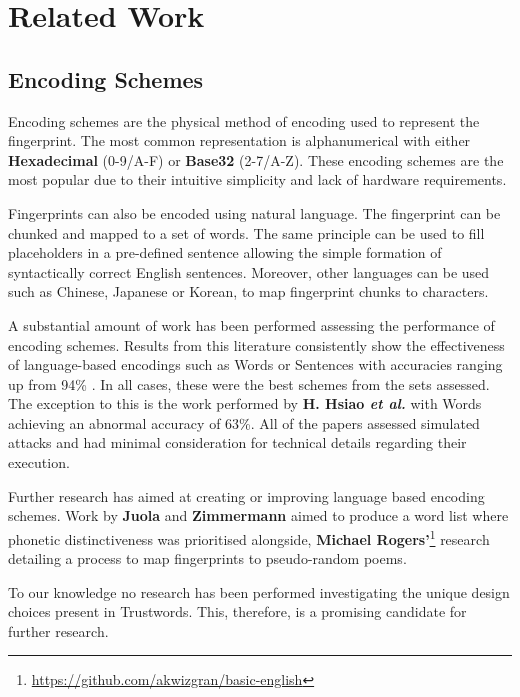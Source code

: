 \section{Related Work}

\subsection{Encoding Schemes}
Encoding schemes are the physical method of encoding used to represent the fingerprint. The most common representation is alphanumerical with either \textbf{Hexadecimal} (0-9/A-F) or \textbf{Base32} (2-7/A-Z). These encoding schemes are the most popular due to their intuitive simplicity and lack of hardware requirements.

Fingerprints can also be encoded using natural language. The fingerprint can be chunked and mapped to a set of words. The same principle can be used to fill placeholders in a pre-defined sentence allowing the simple formation of syntactically correct English sentences. Moreover, other languages can be used such as Chinese, Japanese or Korean, to map fingerprint chunks to characters.

A substantial amount of work has been performed assessing the performance of encoding schemes. Results from this literature consistently show the effectiveness of language-based encodings such as Words or Sentences with accuracies ranging up from 94\% \cite{dechand2016empirical}\cite{tan2017can}\cite{kainda2009usability}. In all cases, these were the best schemes from the sets assessed. The exception to this is the work performed by \textbf{H. Hsiao \textit{et al.}}\cite{hsiao2009study} with Words achieving an abnormal accuracy of 63\%. All of the papers assessed simulated attacks and had minimal consideration for technical details regarding their execution. 

Further research has aimed at creating or improving language based encoding schemes. Work by \textbf{Juola} and \textbf{Zimmermann} \cite{juola1996whole} aimed to produce a word list where phonetic distinctiveness was prioritised alongside, \textbf{Michael Rogers'}\footnote{\url{https://github.com/akwizgran/basic-english}} research detailing a process to map fingerprints to pseudo-random poems.

To our knowledge no research has been performed investigating the unique design choices present in Trustwords. This, therefore, is a promising candidate for further research.